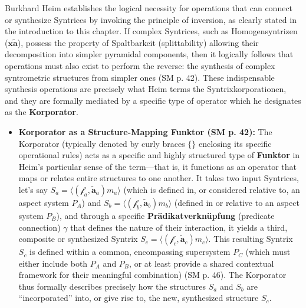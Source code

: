 \documentclass[12pt]{article}
\newcommand{\q}[1]{\enquote{#1}}
\newcommand{\homogeneoussyntrix}{\bm{x\widetilde{a}}}
\newcommand{\metrophor}{\bm{\widetilde{a}}}
\newcommand{\synkolator}{\mathcal{f}}
\newcommand{\synkolationsstufe}{m}
\newcommand{\aspektivsystem}{P}
\begin{document}
Burkhard Heim establishes the logical necessity for operations that can connect or synthesize Syntrices by invoking the principle of inversion, as clearly stated in the introduction to this chapter. If complex Syntrices, such as Homogensyntrizen (\(\homogeneoussyntrix\)), possess the property of Spaltbarkeit (splittability) allowing their decomposition into simpler pyramidal components, then it logically follows that operations must also exist to perform the reverse: the synthesis of complex syntrometric structures from simpler ones (SM p. 42). These indispensable synthesis operations are precisely what Heim terms the Syntrixkorporationen, and they are formally mediated by a specific type of operator which he designates as the \textbf{Korporator}.

\begin{itemize}
    \item \textbf{Korporator as a Structure-Mapping Funktor (SM p. 42):}
    The Korporator (typically denoted by curly braces \( \{ \} \) enclosing its specific operational rules) acts as a specific and highly structured type of \textbf{Funktor} in Heim's particular sense of the term—that is, it functions as an operator that maps or relates entire structures to one another. It takes two input Syntrices, let's say \( S_a = \langle(\synkolator_a, \metrophor_a) \synkolationsstufe_a\rangle \) (which is defined in, or considered relative to, an aspect system \( \aspektivsystem_A \)) and \( S_b = \langle(\synkolator_b, \metrophor_b) \synkolationsstufe_b\rangle \) (defined in or relative to an aspect system \( \aspektivsystem_B \)), and through a specific \textbf{Prädikatverknüpfung} (predicate connection) \( \gamma \) that defines the nature of their interaction, it yields a third, composite or synthesized Syntrix \( S_c = \langle(\synkolator_c, \metrophor_c) \synkolationsstufe_c\rangle \). This resulting Syntrix \( S_c \) is defined within a common, encompassing supersystem \( \aspektivsystem_C \) (which must either include both \( \aspektivsystem_A \) and \( \aspektivsystem_B \), or at least provide a shared contextual framework for their meaningful combination) (SM p. 46). The Korporator thus formally describes precisely how the structures \( S_a \) and \( S_b \) are \q{incorporated} into, or give rise to, the new, synthesized structure \( S_c \).


\end{itemize}
\end{document}
